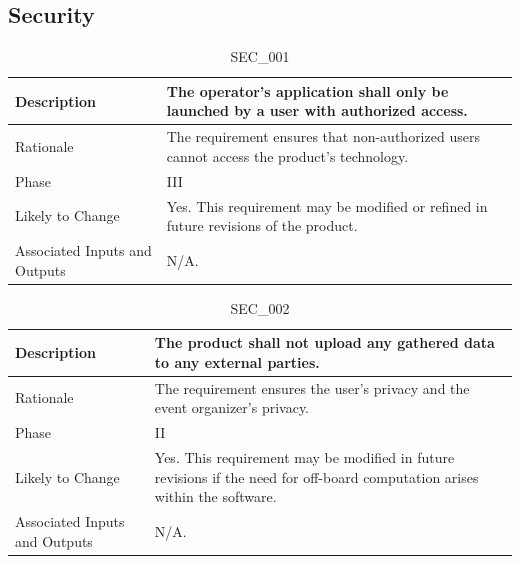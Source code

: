 \documentclass{article}
\begin{document}
\subsection{Security}
\begin{table}[!h]
\begin{center}
\caption {SEC\_001} 
\label{SEC_001}
\begin{tabular}{ | m{3cm} | m{11cm} | }
\hline
Description & The operator's application shall only be launched by a user with authorized access. \\
\hline
Rationale & The requirement ensures that non-authorized users cannot access the product's technology. \\
\hline
Phase & III \\
\hline
Likely to Change & Yes. This requirement may be modified or refined in future revisions of the product. \\
\hline
Associated Inputs and Outputs & N/A.  \\
\hline
\end{tabular}
\end{center}
\end{table}

\begin{table}[!h]
\begin{center}
\caption {SEC\_002} 
\label{SEC_002}
\begin{tabular}{ | m{3cm} | m{11cm} | }
\hline
Description & The product shall not upload any gathered data to any external parties. \\
\hline
Rationale & The requirement ensures the user's privacy and the event organizer's privacy. \\
\hline
Phase & II \\
\hline
Likely to Change & Yes. This requirement may be modified in future revisions if the need for off-board computation arises within the software. \\
\hline
Associated Inputs and Outputs & N/A.  \\
\hline
\end{tabular}
\end{center}
\end{table}

\clearpage
\newpage
\end{document}
